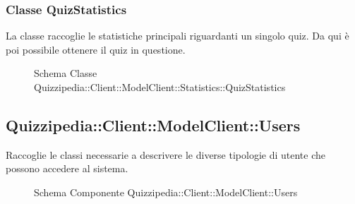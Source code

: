 \subsubsection{Classe QuizStatistics}
La classe raccoglie le statistiche principali riguardanti un singolo quiz. Da qui è poi possibile ottenere il quiz in questione.
\begin{figure}[H]
\centering
\noindent{}
\caption[Schema Classe QuizStatistics]{Schema Classe Quizzipedia::Client::ModelClient::Statistics::QuizStatistics}
\end{figure}
\subsection{Quizzipedia::Client::ModelClient::Users}
Raccoglie le classi necessarie a descrivere le diverse tipologie di utente che possono accedere al sistema.
\begin{figure}[H]
\centering
\noindent{}
\caption[Schema Componente Quizzipedia::Client::ModelClient::Users]{Schema Componente Quizzipedia::Client::ModelClient::Users}
\end{figure}
